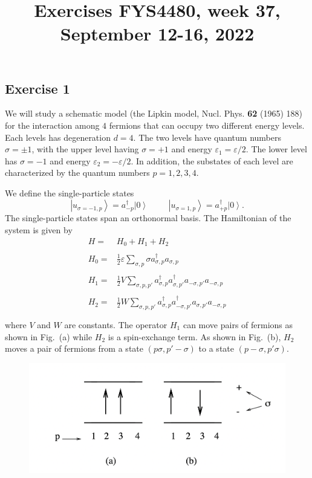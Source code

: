 \documentclass[prc]{revtex4}
\newcommand{\ket}[1]{\left| #1 \right\rangle}
\begin{document}
\title{Exercises FYS4480, week 37, September 12-16, 2022}
\maketitle
\subsection*{Exercise 1}

We will study a schematic model (the Lipkin model, Nucl.
Phys. {\bf 62} (1965) 188) for the interaction among  $4$
fermions that can occupy two different energy levels. Each levels has degeneration $d=4$. The two levels have quantum numbers $\sigma=\pm 1$,
with the upper level having  $\sigma=+1$ and energy
$\varepsilon_{1}=
\varepsilon/2$. The lower level  has $\sigma=-1$ and energy
$\varepsilon_{2}=-\varepsilon/2$. 
In addition, the substates  of each level are characterized  
by the quantum numbers $p=1,2,3,4$.

We define the single-particle states
\[
\ket{u_{\sigma =-1,p}}=a_{-p}^{\dagger}\ket{0}
\hspace{1cm}
\ket{u_{\sigma =1,p}}=a_{+p}^{\dagger}\ket{0}.
\]
The single-particle states span an orthonormal basis.
The Hamiltonian of the system is given by
\[
\begin{array}{ll}
H=&H_{0}+H_{1}+H_{2}\\
&\\
H_{0}=&\frac{1}{2}\varepsilon\sum_{\sigma ,p}\sigma
a_{\sigma,p}^{\dagger}a_{\sigma ,p}\\
&\\
H_{1}=&\frac{1}{2}V\sum_{\sigma ,p,p'}
a_{\sigma,p}^{\dagger}a_{\sigma ,p'}^{\dagger}
a_{-\sigma ,p'}a_{-\sigma ,p}\\
&\\
H_{2}=&\frac{1}{2}W\sum_{\sigma ,p,p'}
a_{\sigma,p}^{\dagger}a_{-\sigma ,p'}^{\dagger}
a_{\sigma ,p'}a_{-\sigma ,p}\\
&\\
\end{array}
\]
where $V$ and $W$ are constants. The operator 
$H_{1}$ can move pairs of fermions as shown in Fig.~(a)
while $H_{2}$ is a spin-exchange term.
As shown in Fig.~(b),
$H_{2}$ moves a pair of fermions from a state $(p\sigma ,p' -\sigma)$ to a state
$(p-\sigma ,p'\sigma)$.
\begin{figure}[hbtp]
\centering
\includegraphics[width=.4\textwidth]{lipkin.png}
\end{figure}
\end{document}
